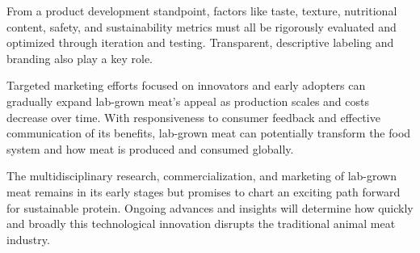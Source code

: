 \documentclass[10pt]{article}
\begin{document}
\begin{sloppypar}
  From a product development standpoint, factors like taste, texture, nutritional content, safety, and sustainability metrics must all be rigorously evaluated and optimized through iteration and testing. Transparent, descriptive labeling and branding also play a key role.

  Targeted marketing efforts focused on innovators and early adopters can gradually expand lab-grown meat's appeal as production scales and costs decrease over time. With responsiveness to consumer feedback and effective communication of its benefits, lab-grown meat can potentially transform the food system and how meat is produced and consumed globally.

  The multidisciplinary research, commercialization, and marketing of lab-grown meat remains in its early stages but promises to chart an exciting path forward for sustainable protein. Ongoing advances and insights will determine how quickly and broadly this technological innovation disrupts the traditional animal meat industry.

  \pagebreak
  \singlespacing %
  
  

\end{sloppypar}
\end{document}
